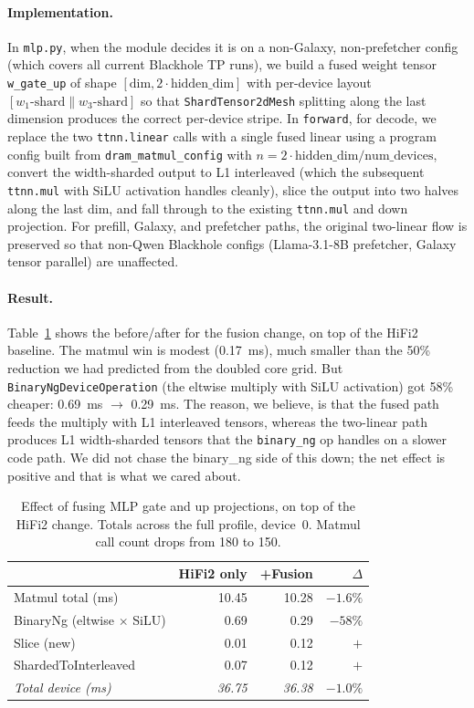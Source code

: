 \documentclass[sigplan,nonacm]{acmart}
\begin{document}
\paragraph{Implementation.} In \texttt{mlp.py}, when the module
decides it is on a non-Galaxy, non-prefetcher config (which covers
all current Blackhole TP runs), we build a fused weight tensor
\texttt{w\_gate\_up} of shape $[\text{dim}, 2 \cdot \text{hidden\_dim}]$
with per-device layout $[w_1\text{-shard} \parallel w_3\text{-shard}]$
so that \texttt{ShardTensor2dMesh} splitting along the last dimension
produces the correct per-device stripe. In \texttt{forward}, for
decode, we replace the two \texttt{ttnn.linear} calls with a single
fused linear using a program config built from \texttt{dram\_matmul\_config}
with $n = 2\cdot\text{hidden\_dim}/\text{num\_devices}$, convert the
width-sharded output to L1 interleaved (which the subsequent
\texttt{ttnn.mul} with SiLU activation handles cleanly), slice the
output into two halves along the last dim, and fall through to the
existing \texttt{ttnn.mul} and down projection. For prefill, Galaxy,
and prefetcher paths, the original two-linear flow is preserved so
that non-Qwen Blackhole configs (Llama-3.1-8B prefetcher, Galaxy
tensor parallel) are unaffected.

\paragraph{Result.}
Table~\ref{tab:fusion} shows the before/after for the fusion change,
on top of the HiFi2 baseline. The matmul win is modest (0.17~ms),
much smaller than the 50\% reduction we had predicted from the
doubled core grid. But \texttt{BinaryNgDeviceOperation} (the eltwise
multiply with SiLU activation) got 58\% cheaper: 0.69~ms $\to$ 0.29~ms.
The reason, we believe, is that the fused path feeds the multiply
with L1 interleaved tensors, whereas the two-linear path produces
L1 width-sharded tensors that the \texttt{binary\_ng} op handles on a
slower code path. We did not chase the binary\_ng side of this down;
the net effect is positive and that is what we cared about.

\begin{table}[h]
\centering
\small
\caption{Effect of fusing MLP gate and up projections, on top of
the HiFi2 change. Totals across the full profile, device~0.
Matmul call count drops from 180 to 150.}
\label{tab:fusion}
\begin{tabular}{lrrr}
\toprule
 & HiFi2 only & +Fusion & $\Delta$ \\
\midrule
Matmul total (ms)                  & 10.45 & 10.28 & ${-}1.6\%$ \\
BinaryNg (eltwise $\times$ SiLU)   &  0.69 &  0.29 & ${-}58\%$  \\
Slice (new)                        &  0.01 &  0.12 & $+$ \\
ShardedToInterleaved               &  0.07 &  0.12 & $+$ \\
\midrule
\emph{Total device (ms)}           & \emph{36.75} & \emph{36.38} & ${-}1.0\%$ \\
\bottomrule
\end{tabular}
\end{table}
\end{document}
